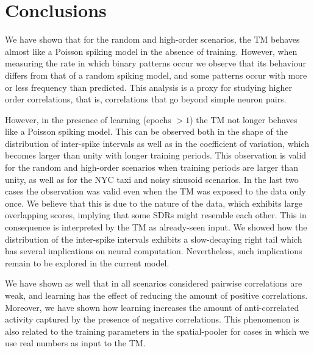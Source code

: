 \documentclass[11pt,letterpaper]{article}
\begin{document}
    \section{Conclusions}
        
        We have shown that for the random and high-order scenarios, the TM behaves almost like a 
        Poisson spiking model in the absence of training. However, when measuring the rate in which
        binary patterns occur we observe that its behaviour differs from that of a random spiking model,
        and some patterns occur with more or less frequency than predicted.
        This analysis is a proxy for studying higher order correlations, that is, correlations
        that go beyond simple neuron pairs.
        
        However, in the presence of learning (epochs $> 1$) the TM not longer behaves like a Poisson
        spiking model. This can be observed both in the shape of the distribution of inter-spike intervals
        as well as in the coefficient of variation, which becomes larger than unity with longer training
        periods.
        This observation is valid for the random and high-order scenarios when training periods are larger than
        unity, as well as for the NYC taxi and noisy sinusoid scenarios.
        In the last two cases the observation was valid even when the TM was exposed to the data only once.
        We believe that this is due to the nature of the data, which exhibits large overlapping scores, 
        implying that some SDRs might resemble each other. 
        This in consequence is interpreted by the TM as already-seen input.
        We showed how the distribution of the inter-spike intervals exhibits a slow-decaying right tail
        which has several implications on neural computation.
        Nevertheless, such implications remain to be explored in the current model.
        
        We have shown as well that in all scenarios considered pairwise correlations are weak, and learning
        has the effect of reducing the amount of positive correlations.
        Moreover, we have shown how learning increases the amount of anti-correlated activity captured by the
        presence of negative correlations.
        This phenomenon is also related to the training parameters in the spatial-pooler for cases in which
        we use real numbers as input to the TM.
        
\end{document}
